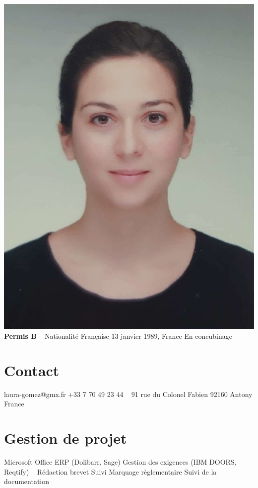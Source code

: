 \documentclass{cv-style}     %
\begin{document}


\begin{aside}
    \includegraphics[width=.8\columnwidth]{img/LG}
    \textbf{Permis B}
    ~
    Nationalité Française
    13 janvier 1989, France
    En concubinage
    \section{Contact}
    laura-gomez@gmx.fr
    +33 7 70 49 23 44
    ~
    91 rue du Colonel Fabien
    92160 Antony
    France
    \section{Gestion de projet}
    Microsoft Office
    ERP (Dolibarr, Sage)
    Gestion des exigences (IBM DOORS, Reqtify)
    ~
    Rédaction brevet
    Suivi Marquage règlementaire
    Suivi de la documentation

\end{aside}
\end{document}
